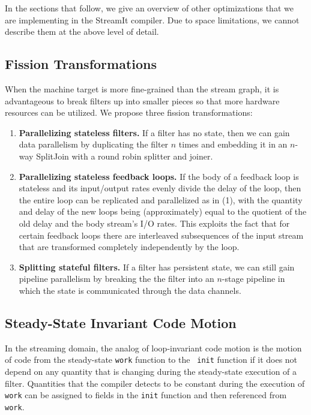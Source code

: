 In the sections that follow, we give an overview of other optimizations
that we are implementing in the StreamIt compiler.  Due to space
limitations, we cannot describe them at the above level of detail.

%

\subsection{Fission Transformations}

When the machine target is more fine-grained than the stream graph, it
is advantageous to break filters up into smaller pieces so that more
hardware resources can be utilized.  We propose three fission
transformations:
\begin{enumerate}
\item {\bf Parallelizing stateless filters.}  If a filter has no state,
  then we can gain data parallelism by duplicating the filter $n$ times
  and embedding it in an $n$-way SplitJoin with a round robin splitter
  and joiner.
\item {\bf Parallelizing stateless feedback loops.}  If the body of a
  feedback loop is stateless and its input/output rates evenly divide
  the delay of the loop, then the entire loop can be replicated and
  parallelized as in (1), with the quantity and delay of the new loops
  being (approximately) equal to the quotient of the old delay and the
  body stream's I/O rates.  This exploits the fact that for certain
  feedback loops there are interleaved subsequences of the input stream
  that are transformed completely independently by the loop.

\item {\bf Splitting stateful filters.}  If a filter has persistent
  state, we can still gain pipeline parallelism by breaking the the
  filter into an $n$-stage pipeline in which the state is communicated
  through the data channels.
\end{enumerate}

\subsection{Steady-State Invariant Code Motion}

In the streaming domain, the analog of loop-invariant code motion is the
motion of code from the steady-state {\tt work} function to the {\tt
init} function if it does not depend on any quantity that is changing
during the steady-state execution of a filter.  Quantities that the
compiler detects to be constant during the execution of {\tt work} can
be assigned to fields in the {\tt init} function and then referenced
from {\tt work}.

